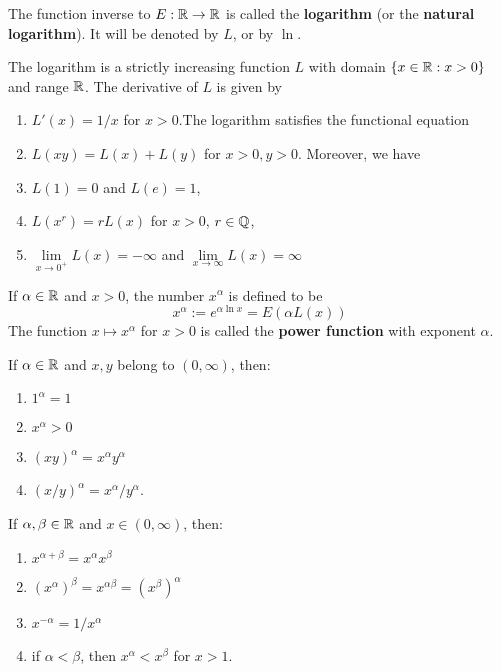 \begin{definition}
	The function inverse to $E:\mathbb{R} \to \mathbb{R}$ is called the \textbf{logarithm} (or the \textbf{natural logarithm}). It will be denoted by $L$, or by $\ln$.
\end{definition}

\begin{theorem}
	The logarithm is a strictly increasing function $L$ with domain $\{x \in \mathbb{R} : x > 0\}$ and range $\mathbb{R}$. The derivative of $L$ is given by
	\begin{enumerate}
		\item $L'(x)=1/x$ for $x >0$.The logarithm satisfies the functional equation
		\item $L(xy)=L(x)+L(y)$ for $x>0,  y>0$. Moreover, we have
		\item $L(1)=0$ and $L(e)=1$,
		\item $L(x^r)=rL(x)$ for $x > 0$, $r \in \mathbb{Q}$,
		\item $\lim\limits_{x \to 0^+} L(x)=-\infty$ and $\lim\limits_{x \to \infty}L(x) = \infty$
	\end{enumerate}
\end{theorem}

\begin{definition}
	If $\alpha \in \mathbb{R}$ and $x > 0$, the number $x^\alpha$ is defined to be
	\[x^\alpha := e^{\alpha \ln x}=E(\alpha L(x))\]
	The function $x \mapsto x^\alpha$ for $x > 0$ is called the \textbf{power function} with exponent $\alpha$.
\end{definition}

\begin{theorem}
	If $\alpha \in \mathbb{R}$ and $x,y$ belong to $(0, \infty)$, then:
	\begin{enumerate}
		\item $1^\alpha = 1$
		\item $x^\alpha >0$
		\item $(xy)^\alpha = x^\alpha y^\alpha$
		\item $(x/y)^\alpha = x^\alpha / y^\alpha$.
	\end{enumerate}
\end{theorem}

\begin{theorem}
	If $\alpha, \beta \in \mathbb{R}$ and $x \in (0,\infty)$, then:
	\begin{enumerate}
		\item $x^{\alpha + \beta}=x^\alpha x^\beta$
		\item $(x^\alpha)^\beta = x^{\alpha \beta}=(x^\beta)^\alpha$
		\item $x^{-\alpha} = 1/x^\alpha$
		\item if $\alpha < \beta$, then $x^\alpha < x^\beta$ for $x > 1$.
	\end{enumerate}
\end{theorem}

